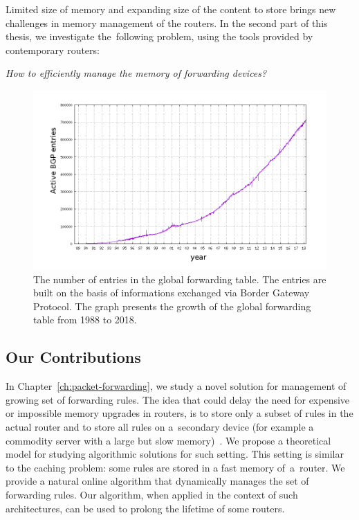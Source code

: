 Limited size of memory and expanding size of the content to store brings new challenges in memory management of the routers.
In the second part of this thesis, we investigate the~following problem, using the tools provided by contemporary routers:
\begin{center}
  \emph{How to efficiently manage the memory of forwarding devices?}
\end{center}

\begin{figure}[t]
\centering
\includegraphics[width=0.79\columnwidth]{figs/bgp-entries.png}
\caption{The number of entries in the global forwarding table. The entries are built on the basis of informations exchanged via Border Gateway Protocol. The graph presents the growth of the global forwarding table from 1988 to 2018.}\label{fig:bgp-entries}
\end{figure}


\subsection{Our Contributions}

In Chapter~\ref{ch:packet-forwarding}, we study a novel solution for management of growing set of forwarding rules.
The idea that could delay the need for expensive or impossible memory upgrades in routers, is to store
only a subset of rules in the actual router and to store all rules on a~secondary
device (for example a commodity server with a large but slow
memory)~\cite{cacheflow,route-caching-flat,prefix-caching,fib-caching-non-overlapping,fibium-zipf}.
We propose a theoretical model for studying algorithmic solutions for such setting.
This setting is similar to the caching problem: some rules are stored in a fast memory of~a~router.
We provide a natural online algorithm that dynamically manages the set of forwarding rules.
Our 
algorithm, when applied in the context of such architectures, can 
be used to prolong the lifetime of some routers.



